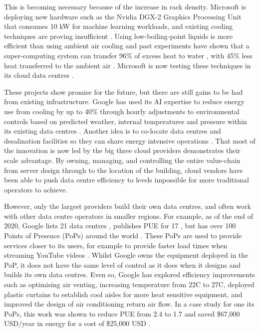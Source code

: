 \documentclass{article}
\begin{document}
This is becoming necessary because of the increase in rack density. Microsoft
is deploying new hardware such as the Nvidia DGX-2 Graphics Processing Unit
that consumes 10 kW for machine learning workloads, and existing cooling
techniques are proving insufficient \cite{russinovich_inside_2020}. Using
low-boiling-point liquids is more efficient than using ambient air cooling
\cite{meijer_cooling_2010} and past experiments have shown that a
super-computing system can transfer 96\% of excess heat to water
\cite{ellsworth_overview_2012}, with 45\% less heat transferred to the ambient
air \cite{ellsworth_energy_2010}. Microsoft is now testing these techniques in
its cloud data centres \cite{russinovich_inside_2020}.

These projects show promise for the future, but there are still gains to be had
from existing infrastructure. Google has used its AI expertise to reduce energy
use from cooling by up to 40\% through hourly adjustments to environmental
controls based on predicted weather, internal temperatures and pressure within
its existing data centres \cite{evans_deepmind_2016,gao_machine_2017}. Another
idea is to co-locate data centres and desalination facilities so they can share
energy intensive operations \cite{hamilton_data_2014}. That most of the
innovation is now led by the big three cloud providers demonstrates their scale
advantage. By owning, managing, and controlling the entire value-chain from
server design through to the location of the building, cloud vendors have been
able to push data centre efficiency to levels impossible for more traditional
operators to achieve.

However, only the largest providers build their own data centres, and often
work with other data centre operators in smaller regions. For example, as of
the end of 2020, Google lists 21 data centres \cite{google_locations_2020},
publishes PUE for 17 \cite{google_efficiency_2020}, but has over 100 Points of
Presence (PoPs) around the world \cite{google_edge_2020}. These PoPs are used
to provide services closer to its users, for example to provide faster load
times when streaming YouTube videos \cite{loh_click_2019}. Whilst Google owns
the equipment deployed in the PoP, it does not have the same level of control
as it does when it designs and builds its own data centres. Even so, Google has
explored efficiency improvements such as optimising air venting, increasing
temperature from 22C to 27C, deployed plastic curtains to establish cool aisles
for more heat sensitive equipment, and improved the design of air conditioning
return air flow. In a case study for one its PoPs, this work was shown to
reduce PUE from 2.4 to 1.7 and saved \$67,000 USD/year in energy for a cost of
\$25,000 USD \cite{google_pop_2011}.
\end{document}
